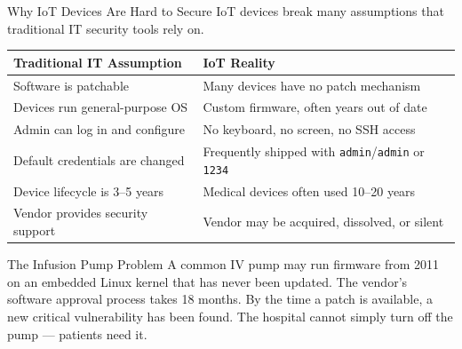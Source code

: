 \documentclass[aspectratio=169]{beamer}  %
\begin{document}
\begin{frame}{Why IoT Devices Are Hard to Secure}
    \footnotesize
    IoT devices break many assumptions that traditional IT security tools rely on.

    \vspace{0.3em}
    \begin{table}[]
        \renewcommand{\arraystretch}{1.3}
        \centering
        \small
        \begin{tabular}{|l|l|}
        \hline
        \rowcolor[HTML]{EFEFEF} \textbf{Traditional IT Assumption} & \textbf{IoT Reality} \\ \hline
        Software is patchable & Many devices have no patch mechanism \\ \hline
        Devices run general-purpose OS & Custom firmware, often years out of date \\ \hline
        Admin can log in and configure & No keyboard, no screen, no SSH access \\ \hline
        Default credentials are changed & Frequently shipped with \texttt{admin}/\texttt{admin} or \texttt{1234} \\ \hline
        Device lifecycle is 3--5 years & Medical devices often used 10--20 years \\ \hline
        Vendor provides security support & Vendor may be acquired, dissolved, or silent \\ \hline
        \end{tabular}
    \end{table}

    \begin{exampleblock}{The Infusion Pump Problem}
        \footnotesize
        A common IV pump may run firmware from 2011 on an embedded Linux kernel that has never been updated. The vendor's software approval process takes 18 months. By the time a patch is available, a new critical vulnerability has been found. The hospital cannot simply turn off the pump --- patients need it.
    \end{exampleblock}
\end{frame}
\end{document}
